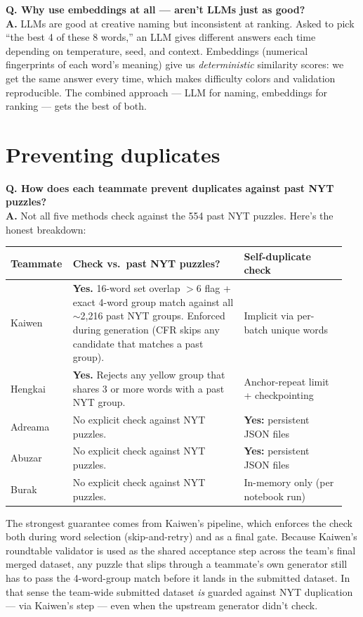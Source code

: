\documentclass[11pt, letterpaper]{article}
\newcommand{\qitem}[1]{\vspace{0.6em}\noindent\textbf{\color{accent}Q. #1}\\[0.2em]}
\newcommand{\aitem}{\noindent\textbf{A.} }
\begin{document}
\qitem{Why use embeddings at all --- aren't LLMs just as good?}
\aitem
LLMs are good at creative naming but inconsistent at ranking. Asked to pick
``the best 4 of these 8 words,'' an LLM gives different answers each time
depending on temperature, seed, and context. Embeddings (numerical
fingerprints of each word's meaning) give us \emph{deterministic} similarity
scores: we get the same answer every time, which makes difficulty colors
and validation reproducible. The combined approach --- LLM for naming,
embeddings for ranking --- gets the best of both.

\section*{Preventing duplicates}

\qitem{How does each teammate prevent duplicates against past NYT puzzles?}
\aitem
Not all five methods check against the 554 past NYT puzzles. Here's the
honest breakdown:

\begin{center}
\small
\begin{tabular}{p{0.15\linewidth} p{0.5\linewidth} p{0.3\linewidth}}
\toprule
\textbf{Teammate} & \textbf{Check vs.~past NYT puzzles?} & \textbf{Self-duplicate check} \\
\midrule
Kaiwen  & \textbf{Yes.} 16-word set overlap $>\!6$ flag + exact 4-word group match against all $\sim$2{,}216 past NYT groups. Enforced during generation (CFR skips any candidate that matches a past group). & Implicit via per-batch unique words \\
Hengkai & \textbf{Yes.} Rejects any yellow group that shares 3 or more words with a past NYT group. & Anchor-repeat limit + checkpointing \\
Adreama & No explicit check against NYT puzzles. & \textbf{Yes:} persistent JSON files \\
Abuzar  & No explicit check against NYT puzzles. & \textbf{Yes:} persistent JSON files \\
Burak   & No explicit check against NYT puzzles. & In-memory only (per notebook run) \\
\bottomrule
\end{tabular}
\end{center}

The strongest guarantee comes from Kaiwen's pipeline, which enforces the check
both during word selection (skip-and-retry) and as a final gate. Because
Kaiwen's roundtable validator is used as the shared acceptance step across
the team's final merged dataset, any puzzle that slips through a teammate's
own generator still has to pass the 4-word-group match before it lands in the
submitted dataset. In that sense the team-wide submitted dataset \emph{is}
guarded against NYT duplication --- via Kaiwen's step --- even when the
upstream generator didn't check.
\end{document}
